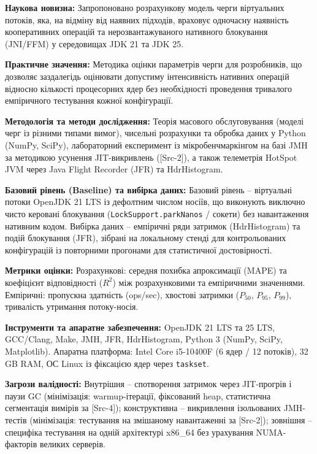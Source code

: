 \textbf{Наукова новизна:} Запропоновано розрахункову модель черги віртуальних потоків, яка, на відміну від наявних підходів, враховує одночасну наявність кооперативних операцій та нерозвантажуваного нативного блокування (JNI/FFM) у середовищах JDK 21 та JDK 25.

\textbf{Практичне значення:} Методика оцінки параметрів черги для розробників, що дозволяє заздалегідь оцінювати допустиму інтенсивність нативних операцій відносно кількості процесорних ядер без необхідності проведення тривалого емпіричного тестування кожної конфігурації.

\textbf{Методологія та методи дослідження:} Теорія масового обслуговування (моделі черг із різними типами вимог), чисельні розрахунки та обробка даних у Python (NumPy, SciPy), лабораторний експеримент із мікробенчмаркінгом на базі JMH за методикою усунення JIT-викривлень ([Src-2]), а також телеметрія HotSpot JVM через Java Flight Recorder (JFR) та HdrHistogram.

\textbf{Базовий рівень (Baseline) та вибірка даних:} Базовий рівень -- віртуальні потоки OpenJDK 21 LTS із дефолтним числом носіїв, що виконують виключно чисто керовані блокування (\texttt{LockSupport.parkNanos} / сокети) без навантаження нативним кодом. Вибірка даних -- емпіричні ряди затримок (HdrHistogram) та подій блокування (JFR), зібрані на локальному стенді для контрольованих конфігурацій із повторними прогонами для статистичної достовірності.

\textbf{Метрики оцінки:} Розрахункові: середня похибка апроксимації (MAPE) та коефіцієнт відповідності ($R^2$) між розрахунковими та емпіричними значеннями. Емпіричні: пропускна здатність (ops/sec), хвостові затримки ($P_{50}$, $P_{95}$, $P_{99}$), тривалість утримання потоку-носія.

\textbf{Інструменти та апаратне забезпечення:} OpenJDK 21 LTS та 25 LTS, GCC/Clang, Make, JMH, JFR, HdrHistogram, Python 3 (NumPy, SciPy, Matplotlib). Апаратна платформа: Intel Core i5-10400F (6 ядер / 12 потоків), 32 GB RAM, ОС Linux із фіксацією ядер через \texttt{taskset}.

\textbf{Загрози валідності:} Внутрішня -- спотворення затримок через JIT-прогрів і паузи GC (мінімізація: warmup-ітерації, фіксований heap, статистична сегментація вимірів за [Src-4]); конструктивна -- викривлення ізольованих JMH-тестів (мінімізація: тестування на змішаному навантаженні за [Src-2]); зовнішня -- специфіка тестування на одній архітектурі x86\_64 без урахування NUMA-факторів великих серверів.

